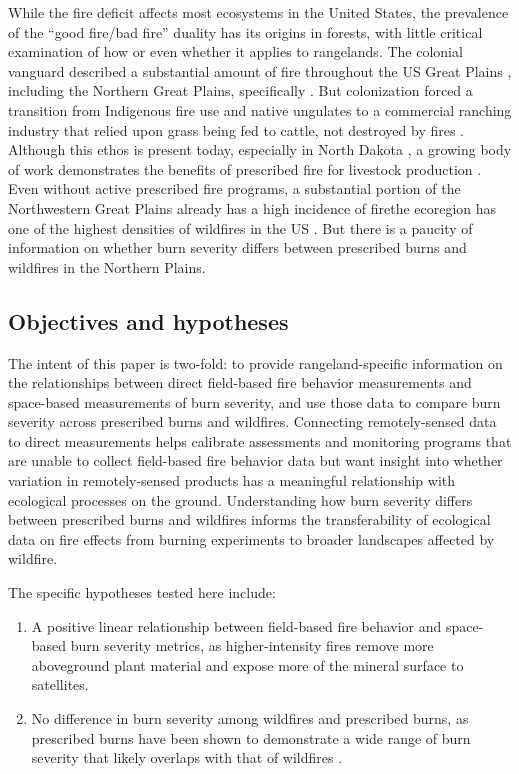 \documentclass[fire,article,submit,oneauthor,pdftex]{Definitions/mdpi}
\begin{document}
While the fire deficit affects most ecosystems in the United States, the prevalence of the ``good fire/bad fire'' duality has its origins in forests, with little critical examination of how or even whether it applies to rangelands. 
The colonial vanguard described a substantial amount of fire throughout the US Great Plains \cite{courtwright2007}, including the Northern Great Plains, specifically \cite{higgins1984,umbanhowar1996}. 
But colonization forced a transition from Indigenous fire use and native ungulates to a commercial ranching industry that relied upon grass being fed to cattle, not destroyed by fires \cite{courtwright2007}. 
Although this ethos is present today, especially in North Dakota \cite{boland2025}, a growing body of work demonstrates the benefits of prescribed fire for livestock production \cite{wanchuk2024, spiess2020, wanchuk2024a}. 
Even without active prescribed fire programs, a substantial portion of the Northwestern Great Plains already has a high incidence of fire\textemdash the ecoregion has one of the highest densities of wildfires in the US \cite{mcgranahan2024}. 
But there is a paucity of information on whether burn severity differs between prescribed burns and wildfires in the Northern Plains. 

\subsection{Objectives and hypotheses} 

The intent of this paper is two-fold: to provide rangeland-specific information on the relationships between direct field-based fire behavior measurements and space-based measurements of burn severity, and use those data to compare burn severity across prescribed burns and wildfires. 
Connecting remotely-sensed data to direct measurements helps calibrate assessments and monitoring programs that are unable to collect field-based fire behavior data but want insight into whether variation in remotely-sensed products has a meaningful relationship with ecological processes on the ground. 
Understanding how burn severity differs between prescribed burns and wildfires informs the transferability of ecological data on fire effects from burning experiments to broader landscapes affected by wildfire. 

The specific hypotheses tested here include: 
\begin{enumerate} 
	\item A positive linear relationship between field-based fire behavior and space-based burn severity metrics, as higher-intensity fires remove more aboveground plant material and expose more of the mineral surface to satellites.
	\item No difference in burn severity among wildfires and prescribed burns, as prescribed burns have been shown to demonstrate a wide range of burn severity that likely overlaps with that of wildfires \cite[e.g., ][]{mcgranahan2025}. 
\end{enumerate}
\end{document}
